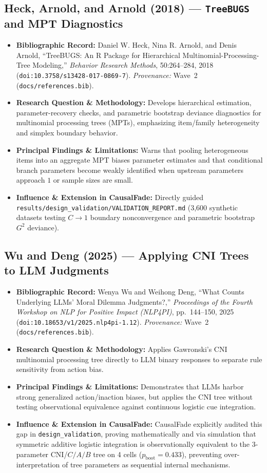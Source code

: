 \subsection{Heck, Arnold, and Arnold (2018) --- \texttt{TreeBUGS} and MPT Diagnostics \citep{heck2018treebugs}}
\begin{itemize}
  \item \textbf{Bibliographic Record:} Daniel W. Heck, Nina R. Arnold, and Denis Arnold, ``TreeBUGS: An R Package for Hierarchical Multinomial-Processing-Tree Modeling,'' \emph{Behavior Research Methods}, 50:264--284, 2018 (\texttt{doi:10.3758/s13428-017-0869-7}). \emph{Provenance:} Wave~2 (\texttt{docs/references.bib}).
  \item \textbf{Research Question \& Methodology:} Develops hierarchical estimation, parameter-recovery checks, and parametric bootstrap deviance diagnostics for multinomial processing trees (MPTs), emphasizing item/family heterogeneity and simplex boundary behavior.
  \item \textbf{Principal Findings \& Limitations:} Warns that pooling heterogeneous items into an aggregate MPT biases parameter estimates and that conditional branch parameters become weakly identified when upstream parameters approach $1$ or sample sizes are small.
  \item \textbf{Influence \& Extension in CausalFade:} Directly guided \texttt{results/design\_validation/VALIDATION\_REPORT.md} (3,600 synthetic datasets testing $C\to 1$ boundary nonconvergence and parametric bootstrap $G^2$ deviance).
\end{itemize}

\subsection{Wu and Deng (2025) --- Applying CNI Trees to LLM Judgments \citep{wuDeng2025counts}}
\begin{itemize}
  \item \textbf{Bibliographic Record:} Wenya Wu and Weihong Deng, ``What Counts Underlying LLMs' Moral Dilemma Judgments?,'' \emph{Proceedings of the Fourth Workshop on NLP for Positive Impact (NLP4PI)}, pp.~144--150, 2025 (\texttt{doi:10.18653/v1/2025.nlp4pi-1.12}). \emph{Provenance:} Wave~2 (\texttt{docs/references.bib}).
  \item \textbf{Research Question \& Methodology:} Applies Gawronski's CNI multinomial processing tree directly to LLM binary responses to separate rule sensitivity from action bias.
  \item \textbf{Principal Findings \& Limitations:} Demonstrates that LLMs harbor strong generalized action/inaction biases, but applies the CNI tree without testing observational equivalence against continuous logistic cue integration.
  \item \textbf{Influence \& Extension in CausalFade:} CausalFade explicitly audited this gap in \texttt{design\_validation}, proving mathematically and via simulation that symmetric additive logistic integration is observationally equivalent to the 3-parameter CNI/$C/A/B$ tree on 4 cells ($p_{\text{boot}} = 0.433$), preventing over-interpretation of tree parameters as sequential internal mechanisms.
\end{itemize}

